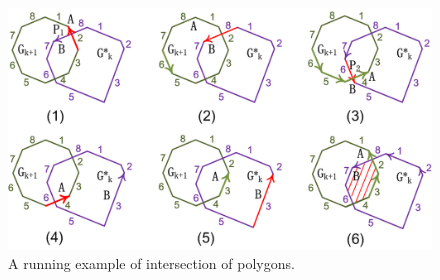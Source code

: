 \begin{figure}[tb!]
\centering
\includegraphics[scale=0.88]{figures/Fig-r-poly-inter.png}
\vspace{-2ex}
\caption{\small A running example of intersection of polygons.}
\label{fig:r-poly-inter}
\end{figure}



